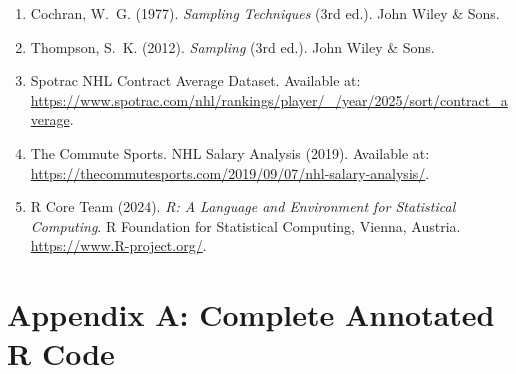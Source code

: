 \documentclass[12pt]{article}
\begin{document}
\begin{enumerate}
  \item Cochran, W.~G. (1977). \textit{Sampling Techniques} (3rd ed.). John Wiley \& Sons.
  \item Thompson, S.~K. (2012). \textit{Sampling} (3rd ed.). John Wiley \& Sons.
  \item Spotrac NHL Contract Average Dataset. Available at:
        \url{https://www.spotrac.com/nhl/rankings/player/_/year/2025/sort/contract_average}.
  \item The Commute Sports. NHL Salary Analysis (2019). Available at:
        \url{https://thecommutesports.com/2019/09/07/nhl-salary-analysis/}.
  \item R Core Team (2024). \textit{R: A Language and Environment for Statistical
        Computing}. R Foundation for Statistical Computing, Vienna, Austria.
        \url{https://www.R-project.org/}.
\end{enumerate}

\newpage

\appendix
\section*{Appendix A: Complete Annotated R Code}


\end{document}
